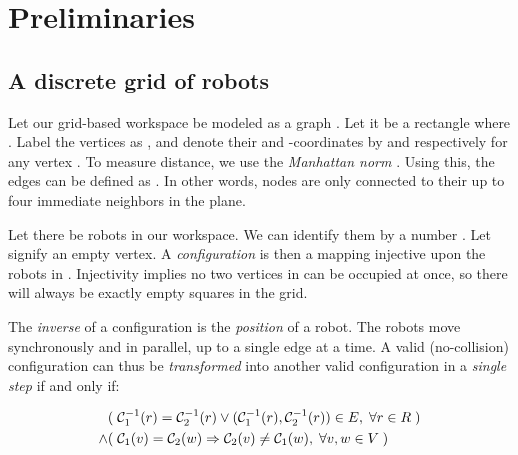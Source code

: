 \section{Preliminaries}

\subsection{A discrete grid of robots}

Let our grid-based workspace be modeled as a graph . Let it be a rectangle  where . Label the vertices as , and denote their  and  -coordinates by  and  respectively for any vertex . To measure distance, we use the \emph{Manhattan norm} . Using this, the edges can be defined as . In other words, nodes are only connected to their up to four immediate neighbors in the plane.

Let there be  robots in our workspace. We can identify them by a number . Let \ilmath{\bot} signify an empty vertex. A \emph{configuration} is then a mapping  injective upon the robots in . Injectivity implies no two vertices in  can be occupied at once, so there will always be exactly  empty squares in the grid.

The \emph{inverse} of a configuration  is the \emph{position} of a robot. The robots move synchronously and in parallel, up to a single edge at a time. A valid (no-collision) configuration  can thus be \emph{transformed} into another valid configuration  in a \emph{single step} if and only if:

\begin{align}
	& (\; \mathcal{C}_{1}^{-1}(r) = \mathcal{C}_{2}^{-1}(r) \lor (\mathcal{C}_{1}^{-1}(r), \mathcal{C}_{2}^{-1}(r)) \in E, \; \forall r \in R \;)\label{req:limited_movement}\\
	\land & (\; \mathcal{C}_{1}(v) = \mathcal{C}_{2}(w) \Rightarrow \mathcal{C}_{2}(v) \neq \mathcal{C}_{1}(w), \; \forall v, w \in V \;)\label{req:no_swaps}
\end{align}

